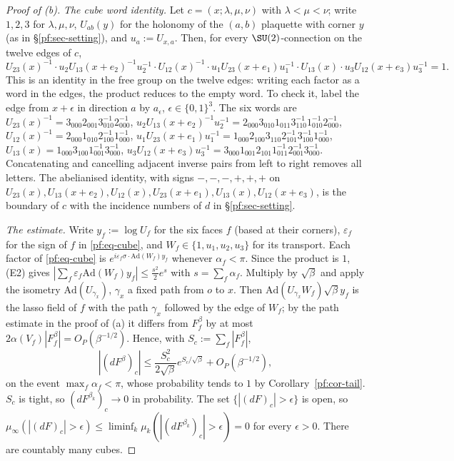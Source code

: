 \begin{proof}[Proof of (b)]
\emph{The cube word identity.} Let $c=(x;\lambda,\mu,\nu)$ with $\lambda<\mu<\nu$; write $1,2,3$ for $\lambda,\mu,\nu$, $U_{ab}(y)$ for the holonomy of the $(a,b)$ plaquette with corner $y$ (as in \S\ref{pf:sec-setting}), and $u_a:=U_{x,a}$. Then, for every $\SU(2)$-connection on the twelve edges of $c$,
\begin{equation}\label{pf:eq-cube}
U_{23}(x)^{-1}\cdot u_2U_{13}(x+e_2)^{-1}u_2^{-1}\cdot U_{12}(x)^{-1}\cdot u_1U_{23}(x+e_1)u_1^{-1}\cdot U_{13}(x)\cdot u_3U_{12}(x+e_3)u_3^{-1}=1 .
\end{equation}
This is an identity in the free group on the twelve edges: writing each factor as a word in the edges, the product reduces to the empty word. To check it, label the edge from $x+\epsilon$ in direction $a$ by $a_\epsilon$, $\epsilon\in\{0,1\}^3$. The six words are
$U_{23}(x)^{-1}=3_{000}2_{001}3_{010}^{-1}2_{000}^{-1}$,
$u_2U_{13}(x+e_2)^{-1}u_2^{-1}=2_{000}3_{010}1_{011}3_{110}^{-1}1_{010}^{-1}2_{000}^{-1}$,
$U_{12}(x)^{-1}=2_{000}1_{010}2_{100}^{-1}1_{000}^{-1}$,
$u_1U_{23}(x+e_1)u_1^{-1}=1_{000}2_{100}3_{110}2_{101}^{-1}3_{100}^{-1}1_{000}^{-1}$,
$U_{13}(x)=1_{000}3_{100}1_{001}^{-1}3_{000}^{-1}$,
$u_3U_{12}(x+e_3)u_3^{-1}=3_{000}1_{001}2_{101}1_{011}^{-1}2_{001}^{-1}3_{000}^{-1}$.
Concatenating and cancelling adjacent inverse pairs from left to right removes all letters. The abelianised identity, with signs $-,-,-,+,+,+$ on $U_{23}(x),U_{13}(x+e_2),U_{12}(x),U_{23}(x+e_1),U_{13}(x),U_{12}(x+e_3)$, is the boundary of $c$ with the incidence numbers of $d$ in \S\ref{pf:sec-setting}.

\emph{The estimate.} Write $y_f:=\log U_f$ for the six faces $f$ (based at their corners), $\varepsilon_f$ for the sign of $f$ in \eqref{pf:eq-cube}, and $W_f\in\{1,u_1,u_2,u_3\}$ for its transport. Each factor of \eqref{pf:eq-cube} is $e^{i\varepsilon_f\sigma\cdot\mathrm{Ad}(W_f)y_f}$ whenever $\alpha_f<\pi$. Since the product is $1$, (E2) gives $|\sum_f\varepsilon_f\mathrm{Ad}(W_f)y_f|\le\frac{s^2}2e^s$ with $s=\sum_f\alpha_f$. Multiply by $\sqrt\beta$ and apply the isometry $\mathrm{Ad}(U_{\gamma_x})$, $\gamma_x$ a fixed path from $o$ to $x$. Then $\mathrm{Ad}(U_{\gamma_x}W_f)\sqrt\beta y_f$ is the lasso field of $f$ with the path $\gamma_x$ followed by the edge of $W_f$; by the path estimate in the proof of (a) it differs from $F^\beta_f$ by at most $2\alpha(V_f)|F^\beta_f|=O_P(\beta^{-1/2})$. Hence, with $S_c:=\sum_f|F^\beta_f|$,
\[
|(dF^\beta)_c|\le\frac{S_c^2}{2\sqrt\beta}e^{S_c/\sqrt\beta}+O_P(\beta^{-1/2}),
\]
on the event $\max_f\alpha_f<\pi$, whose probability tends to $1$ by Corollary~\ref{pf:cor-tail}. $S_c$ is tight, so $(dF^{\beta_k})_c\to0$ in probability. The set $\{|(dF)_c|>\epsilon\}$ is open, so $\mu_\infty(|(dF)_c|>\epsilon)\le\liminf_k\mu_k(|(dF^{\beta_k})_c|>\epsilon)=0$ for every $\epsilon>0$. There are countably many cubes.
\end{proof}

